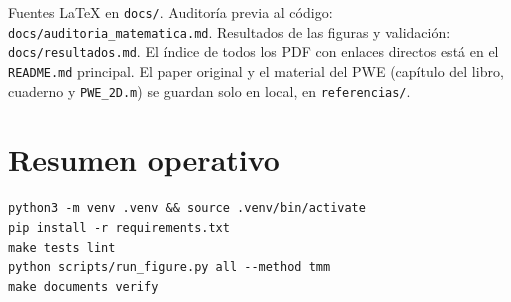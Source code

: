 \documentclass[11pt,a4paper]{article}
\begin{document}
Fuentes LaTeX en \texttt{docs/}. Auditoría previa al código:
\texttt{docs/auditoria\_matematica.md}. Resultados de las figuras y
validación: \texttt{docs/resultados.md}. El índice de todos los PDF con
enlaces directos está en el \texttt{README.md} principal. El paper original y el material del PWE (capítulo del libro, cuaderno y
\texttt{PWE\_2D.m}) se guardan solo en local, en \texttt{referencias/}.

\section{Resumen operativo}

\begin{lstlisting}
python3 -m venv .venv && source .venv/bin/activate
pip install -r requirements.txt
make tests lint
python scripts/run_figure.py all --method tmm
make documents verify
\end{lstlisting}
\end{document}
